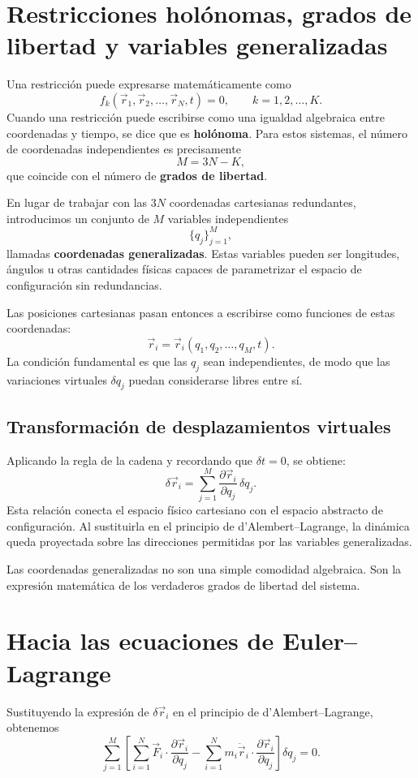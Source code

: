\section{Restricciones holónomas, grados de libertad y variables generalizadas}
Una restricción puede expresarse matemáticamente como
\[
f_k(\vec{r}_1,\vec{r}_2,\dots,\vec{r}_N,t)=0, \qquad k=1,2,\dots,K.
\]
Cuando una restricción puede escribirse como una igualdad algebraica entre coordenadas y tiempo, se dice que es \textbf{holónoma}. Para estos sistemas, el número de coordenadas independientes es precisamente
\[
M = 3N-K,
\]
que coincide con el número de \textbf{grados de libertad}.

En lugar de trabajar con las \(3N\) coordenadas cartesianas redundantes, introducimos un conjunto de \(M\) variables independientes
\[
\{q_j\}_{j=1}^{M},
\]
llamadas \textbf{coordenadas generalizadas}. Estas variables pueden ser longitudes, ángulos u otras cantidades físicas capaces de parametrizar el espacio de configuración sin redundancias.

Las posiciones cartesianas pasan entonces a escribirse como funciones de estas coordenadas:
\[
\vec{r}_i = \vec{r}_i(q_1,q_2,\dots,q_M,t).
\]
La condición fundamental es que las \(q_j\) sean independientes, de modo que las variaciones virtuales \(\delta q_j\) puedan considerarse libres entre sí.

\subsection{Transformación de desplazamientos virtuales}
Aplicando la regla de la cadena y recordando que \(\delta t=0\), se obtiene:
\[
\delta\vec{r}_i = \sum_{j=1}^{M} \frac{\partial\vec{r}_i}{\partial q_j}\,\delta q_j.
\]
Esta relación conecta el espacio físico cartesiano con el espacio abstracto de configuración. Al sustituirla en el principio de d'Alembert--Lagrange, la dinámica queda proyectada sobre las direcciones permitidas por las variables generalizadas.

\begin{importante}
Las coordenadas generalizadas no son una simple comodidad algebraica. Son la expresión matemática de los verdaderos grados de libertad del sistema.
\end{importante}

\section{Hacia las ecuaciones de Euler--Lagrange}
Sustituyendo la expresión de \(\delta\vec{r}_i\) en el principio de d'Alembert--Lagrange, obtenemos
\[
\sum_{j=1}^{M}\left[\sum_{i=1}^{N}\vec{F}_i\cdot\frac{\partial\vec{r}_i}{\partial q_j} - \sum_{i=1}^{N}m_i\ddot{\vec{r}}_i\cdot\frac{\partial\vec{r}_i}{\partial q_j}\right]\delta q_j = 0.
\]

